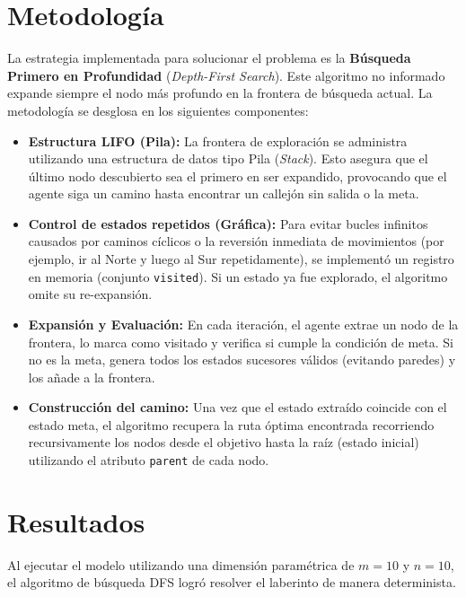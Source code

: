 
\clearpage
\section{Metodología}

La estrategia implementada para solucionar el problema es la \textbf{Búsqueda Primero en Profundidad} (\textit{Depth-First Search}). Este algoritmo no informado expande siempre el nodo más profundo en la frontera de búsqueda actual. La metodología se desglosa en los siguientes componentes:

\begin{itemize}
    \item \textbf{Estructura LIFO (Pila):} La frontera de exploración se administra utilizando una estructura de datos tipo Pila (\textit{Stack}). Esto asegura que el último nodo descubierto sea el primero en ser expandido, provocando que el agente siga un camino hasta encontrar un callejón sin salida o la meta.

    \item \textbf{Control de estados repetidos (Gráfica):} Para evitar bucles infinitos causados por caminos cíclicos o la reversión inmediata de movimientos (por ejemplo, ir al Norte y luego al Sur repetidamente), se implementó un registro en memoria (conjunto \texttt{visited}). Si un estado ya fue explorado, el algoritmo omite su re-expansión.

    \item \textbf{Expansión y Evaluación:} En cada iteración, el agente extrae un nodo de la frontera, lo marca como visitado y verifica si cumple la condición de meta. Si no es la meta, genera todos los estados sucesores válidos (evitando paredes) y los añade a la frontera.

    \item \textbf{Construcción del camino:} Una vez que el estado extraído coincide con el estado meta, el algoritmo recupera la ruta óptima encontrada recorriendo recursivamente los nodos desde el objetivo hasta la raíz (estado inicial) utilizando el atributo \texttt{parent} de cada nodo.
\end{itemize}

\section{Resultados}
Al ejecutar el modelo utilizando una dimensión paramétrica de $m=10$ y $n=10$, el algoritmo de búsqueda DFS logró resolver el laberinto de manera determinista.

